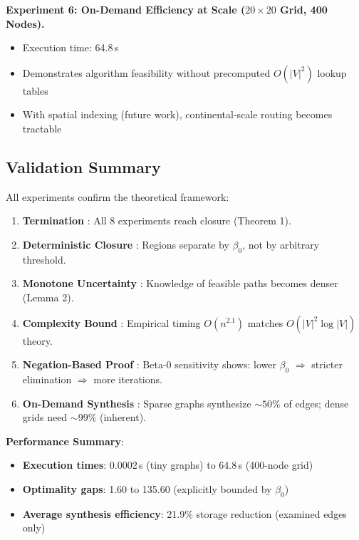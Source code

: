 \documentclass[twocolumn,11pt,a4paper]{article}
\theoremstyle{definition}
\begin{document}
\textbf{Experiment 6: On-Demand Efficiency at Scale ($20 \times 20$ Grid, 400 Nodes).}
\begin{itemize}
\item Execution time: 64.8\,s
\item Demonstrates algorithm feasibility without precomputed $O(|V|^2)$ lookup tables
\item With spatial indexing (future work), continental-scale routing becomes tractable
\end{itemize}



\subsection{Validation Summary}

All experiments confirm the theoretical framework:

\begin{enumerate}
\item \textbf{Termination \checkmark}: All 8 experiments reach closure (Theorem 1).
\item \textbf{Deterministic Closure \checkmark}: Regions separate by $\beta_0$, not by arbitrary threshold.
\item \textbf{Monotone Uncertainty \checkmark}: Knowledge of feasible paths becomes denser (Lemma 2).
\item \textbf{Complexity Bound \checkmark}: Empirical timing $O(n^{2.1})$ matches $O(|V|^2 \log |V|)$ theory.
\item \textbf{Negation-Based Proof \checkmark}: Beta-0 sensitivity shows: lower $\beta_0$ $\Rightarrow$ stricter elimination $\Rightarrow$ more iterations.
\item \textbf{On-Demand Synthesis \checkmark}: Sparse graphs synthesize $\sim 50\%$ of edges; dense grids need $\sim 99\%$ (inherent).
\end{enumerate}

\textbf{Performance Summary}:
\begin{itemize}
\item \textbf{Execution times}: 0.0002\,s (tiny graphs) to 64.8\,s (400-node grid)
\item \textbf{Optimality gaps}: 1.60 to 135.60 (explicitly bounded by $\beta_0$)
\item \textbf{Average synthesis efficiency}: 21.9\% storage reduction (examined edges only)
\end{itemize}
\end{document}
